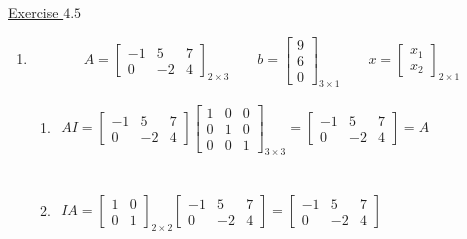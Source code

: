 \underline{Exercise $4.5$}
\begin{enumerate}
\item[1.] \[A=\left[\begin{array}{ccc}-1 & 5 & 7 \\0 & -2 & 4\end{array}\right]_{2 \times 3} \quad \quad b=\left[\begin{array}{c}9 \\6 \\0\end{array}\right]_{3 \times 1} \quad \quad x=\left[\begin{array}{l}x_{1} \\x_{2}\end{array}\right]_{2\times 1}\]

\begin{enumerate}

\item $ \begin{aligned} A I=\left[\begin{array}{ccc}-1 & 5 & 7 \\0 & -2 & 4\end{array}\right]\left[\begin{array}{lll}1 & 0 & 0 \\0 & 1 & 0 \\0 & 0 & 1\end{array}\right]_{3 \times 3}  =\left[\begin{array}{ccc}-1 & 5 & 7 \\0 & -2 & 4\end{array}\right]=A \end{aligned}$  \\~\\

\item $ \begin{aligned} IA =\left[\begin{array}{ll}
1 & 0 \\
0 & 1
\end{array}\right]_{2\times 2}\left[\begin{array}{ccc}
-1 & 5 & 7 \\
0 & -2 & 4
\end{array}\right]  =\left[\begin{array}{rrr}
-1 & 5 & 7 \\
0 & -2 & 4
\end{array}\right] \end{aligned}$ \\~\\


\end{enumerate}
\end{enumerate}

